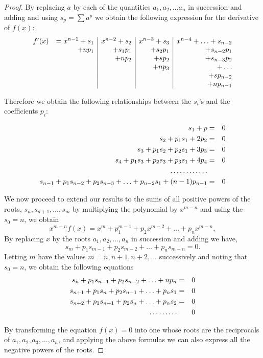 \begin{proof}
By replacing $a$ by each of the quantities $a_1, a_2, ...a_n$ in succession and adding and using $s_p = \sum a^p$ we obtain
the following expression for the derivative of $f(x)$:
\[
\begin{array}{l r | r | r | r}
f'(x)  & =  x^{n-1} + s_1   &  x^{n-2} + s_2&  x^{n-3} + s_3&x^{n-4} + \hdots + s_{n-2} \\
                          &                + n p_1&        + s_1 p_1   &     + s_2 p_1    & +  s_{n-2} p_1   \\
                           &                         &       + n p_2     &      + s p_2     &  +  s_{n-3} p_2  \\
                           &                         &                      &     + np_3           &  + \hdots            \\
                           &                         &                      &                         &  + s p_{n-2}      \\
                           &                         &                      &                         &  + n p_{n-1}         \\
\end{array}
\]

Therefore we obtain the following relationships between the $s_i$'s and the coefficients $p_i$:

\begin{eqnarray*}
s_1 + p &=& 0 \cr
s_2 + p_1s_1 + 2p_2 &=& 0 \cr
s_3 + p_1s_2 + p_2 s_1 + 3 p_3&=& 0 \cr
s_4 + p_1s_3 + p_2 s_3 + p_3 s_1 + 4 p_4&=& 0 \cr
\hdots\hdots\hdots\hdots\cr
s_{n-1} + p_1s_{n-2} + p_2 s_{n-3} + \hdots + p_{n-2} s_1 + (n-1) p_{n-1}&=& 0 \cr
\end{eqnarray*}

We now proceed to extend our results to the sums of all positive powers of the roots, $s_n, s_{n+1}, \hdots, s_m$ by multiplying the 
polynomial by $x^{m-n}$ and using the $s_0 = n$, we obtain
\[ x^{m-n}f(x) = x^m + p_1^{m-1} + p_2 x^{m-2} + \hdots+ p_n x^{m-n},\]
By replacing $x$ by the roots $a_1, a_2, \hdots, a_n$ in succession and adding we have, 
\[ s_m + p_1 s_{m-1} + p_2 s_{m-2} + \hdots + p_n s_{m-n} = 0.\]
Letting $m$ have the values $m=n, n+1, n+2, \hdots$ successively and noting that $s_0 = n$, we obtain the following equations
\begin{eqnarray*}
s_n + p_1s_{n-1} + p_2 s_{n-2} + \hdots + np_n &=& 0\cr
s_{n+1} + p_1s_n + p_2 s_{n-1} + \hdots + p_n s_1 &=& 0\cr
s_{n+2} + p_1s_{n+1} + p_2 s_n  + \hdots + p_n s_2 &=& 0\cr
\hdots\hdots\hdots && 0
\end{eqnarray*}

By transforming the equation $f(x) = 0$ into one whose roots are the reciprocals of $a_1, a_2, a_3, \hdots, a_n$, and applying the above
formulas we can also express all the negative powers of the roots. 

\end{proof}

